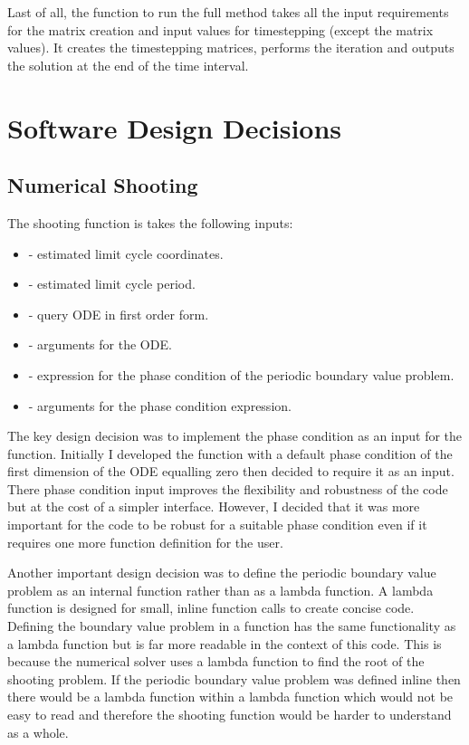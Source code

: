\documentclass[10pt]{article}
\begin{document}
\begin{multicols}{2}
Last of all, the function to run the full method  takes all the input requirements for the matrix creation and input values for timestepping (except the matrix values). It creates the timestepping matrices, performs the iteration and outputs the solution at the end of the time interval.

\section{Software Design Decisions}
\subsection{Numerical Shooting}

The shooting function is takes the following inputs:
\begin{itemize}
    \item {} - estimated limit cycle coordinates.
    \item {} - estimated limit cycle period.
    \item {} - query ODE in first order form.
    \item {} - arguments for the ODE.
    \item {} - expression for the phase condition of the periodic boundary value problem. 
    \item {} - arguments for the phase condition expression.
\end{itemize}

The key design decision was to implement the phase condition as an input for the function. Initially I developed the function with a default phase condition of the first dimension of the ODE equalling zero then decided to require it as an input. There phase condition input improves the flexibility and robustness of the code but at the cost of a simpler interface. However, I decided that it was more important for the code to be robust for a suitable phase condition even if it requires one more function definition for the user.

Another important design decision was to define the periodic boundary value problem as an internal function rather than as a lambda function. A lambda function is designed for small, inline function calls to create concise code. Defining the boundary value problem in a function has the same functionality as a lambda function but is far more readable in the context of this code. This is because the numerical solver uses a lambda function to find the root of the shooting problem. If the periodic boundary value problem was defined inline then there would be a lambda function within a lambda function which would not be easy to read and therefore the shooting function would be harder to understand as a whole.



\end{multicols}
\end{document}
